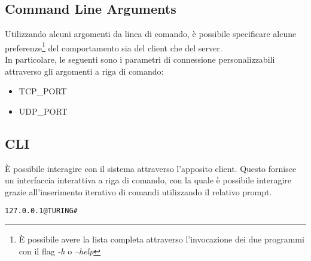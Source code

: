 \documentclass{article}
\begin{document}
\subsection{Command Line Arguments}
Utilizzando alcuni argomenti da linea di comando, è possibile specificare alcune preferenze\footnote{È possibile avere la lista completa attraverso l'invocazione dei due programmi con il flag \textit{-h} o \textit{--help} } del comportamento sia del client che del server. \\
In particolare, le seguenti sono i parametri di connessione personalizzabili attraverso gli argomenti a riga di comando:

\begin{itemize}
	\item TCP\_PORT %
	\item UDP\_PORT
\end{itemize}

\subsection{CLI}
È possibile interagire con il sistema attraverso l'apposito client. Questo fornisce un interfaccia interattiva a riga di comando, con la quale è possibile interagire grazie all'inserimento iterativo di comandi utilizzando il relativo prompt.

\begin{lstlisting}[caption="Turing Client - CLI", xleftmargin=.4\textwidth]
127.0.0.1@TURING#
\end{lstlisting}
\end{document}
